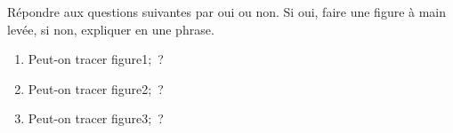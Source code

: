 \documentclass[exercice]{thedocument}%
\begin{document}
%
Répondre aux questions suivantes par oui ou non. Si oui, faire une figure à
main levée, si non, expliquer en une phrase.
\begin{enumerate}
    \item Peut-on tracer \<figure1;~?
    \item Peut-on tracer \<figure2;~?
    \item Peut-on tracer \<figure3;~?
\end{enumerate}
\end{document}
